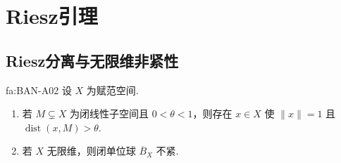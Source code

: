 \section{Riesz引理}\label{sec:i03-riesz}

\subsection{Riesz分离与无限维非紧性}

\begin{FATheorem}[A][Riesz引理与无限维闭单位球非紧]{fa:BAN-A02}
设 \(\displaystyle X\) 为赋范空间.
\begin{enumerate}[label=\textup{(\roman*)}]
\item 若 \(\displaystyle M\subsetneq X\) 为闭线性子空间且 \(\displaystyle 0<\theta<1\)，则存在 \(\displaystyle x\in X\) 使 \(\displaystyle \|x\|=1\) 且 \(\displaystyle \operatorname{dist}(x,M)>\theta\).
\item 若 \(\displaystyle X\) 无限维，则闭单位球 \(\displaystyle \overline B_X\) 不紧.
\end{enumerate}
\end{FATheorem}

